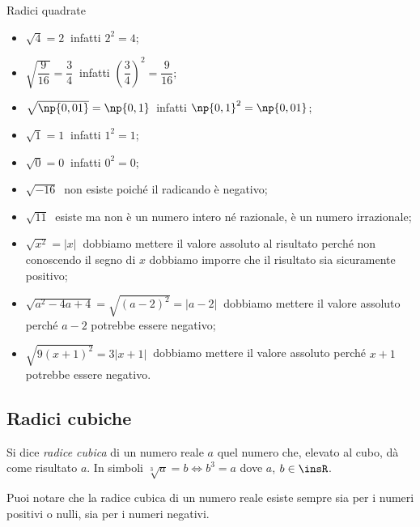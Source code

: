 \begin{exrig}
\begin{esempio}
Radici quadrate
 \begin{multicols}{2}
\begin{itemize}
\item $\sqrt{4}=2\:$ infatti $2^2=4$;
\item $\sqrt{\dfrac{9}{16}}=\dfrac{3}{4}\:$ infatti $\left(\dfrac{3}{4}\right)^2=\dfrac{9}{16}$;
\item $\sqrt{\np{0,01}}=\np{0,1}\:$ infatti $\np{0,1}^2=\np{0,01}$;
\item $\sqrt{1}=1\:$ infatti $1^2=1$;
\item $\sqrt{0}=0\:$ infatti $0^2=0$;
\item $\sqrt{-16}\:$ non esiste poiché il radicando è negativo;
\item $\sqrt{11}\:$ esiste ma non è un numero intero né razionale, è un numero irrazionale;
\item $\sqrt{x^2}=\left|x\right|\:$ dobbiamo mettere il valore assoluto al risultato perché non conoscendo il segno di $x$ dobbiamo imporre che il risultato sia sicuramente positivo;
\item $\sqrt{a^2-4a+4}=\sqrt{(a-2)^2}=\left|a-2\right|\:$ dobbiamo mettere il valore assoluto perché $a-2$ potrebbe essere negativo;
\item $\sqrt{9(x+1)^2}=3\left|x+1\right|\:$ dobbiamo mettere il valore assoluto perché $x+1$ potrebbe essere negativo.
\end{itemize}
\end{multicols}
\end{esempio}
\end{exrig}

\subsection{Radici cubiche}
\begin{definizione}
 Si dice \emph{radice cubica} di un numero reale $a$ quel numero che, elevato al cubo, dà come risultato $a$. In simboli $\sqrt[3]{a}=b \Leftrightarrow b^3=a$ dove $a$, $b\in \insR$.
\end{definizione}

Puoi notare che la radice cubica di un numero reale esiste sempre sia per i numeri positivi o nulli, sia per i numeri negativi.

